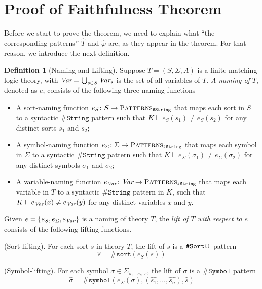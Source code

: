 \documentclass[UTF8,11pt]{article}
\newcounter{thmcounter}
\theoremstyle{plain}
\theoremstyle{definition}
\newtheorem{definition} [thmcounter]{Definition}
\theoremstyle{remark}
\newcommand{\parametric}[2]{{#1}\raisebox{.2ex}{\texttt{\footnotesize{\{}}}#2\raisebox{.2ex}{\texttt{\footnotesize{\}}}}}
\newcommand{\PATTERNS}{\text{P\textsc{atterns}}}
\newcommand{\sharpsymbol}{\#}
\newcommand{\KString}{\texttt{\sharpsymbol String}}
\newcommand{\KSort}{\texttt{\sharpsymbol Sort}}
\newcommand{\Ksort}{\texttt{\sharpsymbol sort}}
\newcommand{\KSymbol}{\texttt{\sharpsymbol Symbol}}
\newcommand{\Ksymbol}{\texttt{\sharpsymbol symbol}}
\begin{document}
%

\section{Proof of Faithfulness Theorem}
\label{sec:proof-of-faithfulness-theorem}
Before we start to prove the theorem, we need to explain what ``the 
corresponding patterns'' $\hat{T}$ and $\hat{\varphi}$ are, as they appear in 
the theorem.
For that reason, we introduce the next definition.

\begin{definition}[Naming and Lifting]
	Suppose $T = (S, \Sigma, A)$ is a finite matching logic theory, with $\textit{Var} 
	= \bigcup_{s \in S} \textit{Var}_s$ is the set of all variables of $T$.
	\emph{A naming of $T$}, denoted as $e$, consists of the following three 
	naming functions
	\begin{itemize}
		\item A sort-naming function $e_S \colon S \to \PATTERNS_\KString$ that 
		maps each sort in $S$ to a syntactic $\KString$ pattern such that $K 
		\vdash e_S(s_1) \neq e_S(s_2)$ for any distinct sorts $s_1$ and $s_2$;
		\item A symbol-naming function $e_\Sigma \colon \Sigma \to 
		\PATTERNS_\KString$ that maps each symbol in $\Sigma$ to a syntactic 
		$\KString$ pattern such that $K \vdash e_\Sigma(\sigma_1) \neq 
		e_\Sigma(\sigma_2)$ for any distinct symbols $\sigma_1$ and $\sigma_2$;
		\item A variable-naming function $e_\Var \colon \Var \to 
		\PATTERNS_\KString$ that maps each variable in $T$ to a syntactic 
		$\KString$ pattern in $K$, such that $K \vdash e_{\textit{Var}}(x) \neq 
		e_{\textit{Var}}(y)$ for any distinct variables $x$ and $y$.
	\end{itemize}
	
	Given $e = \{e_S, e_\Sigma, e_{\textit{Var}} \}$ is a naming of theory $T$, the 
	\emph{lift of $T$ with respect to $e$} consists of the following lifting 
	functions.
	
	(Sort-lifting).
	For each sort $s$ in theory $T$, the lift of $s$ is a 
	$\parametric{\KSort}{}$ pattern
	$$ \hat{s} = \Ksort(e_S(s))$$
	
	(Symbol-lifting).
	For each symbol $\sigma \in \Sigma_{s_1 \dots s_n, s}$, the lift of 
	$\sigma$ is a $\KSymbol$ pattern 
	$$ \hat{\sigma} = \Ksymbol(e_\Sigma(\sigma), (\hat{s_1}, \dots, \hat{s_n}), 
	\hat{s})$$
	

\end{definition}
\end{document}
